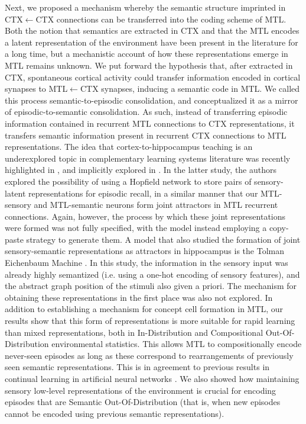 \documentclass{article}
\begin{document}
\newline\newline
Next, we proposed a mechanism whereby the semantic structure imprinted in CTX$\leftarrow$CTX connections can be transferred into the coding scheme of MTL. Both the notion that semantics are extracted in CTX  and that the MTL encodes a latent representation of the environment  have been present in the literature for a long time, but a mechanistic account of how these representations emerge in MTL remains unknown. We put forward the hypothesis that, after extracted in CTX, spontaneous cortical activity could transfer information encoded in cortical synapses to MTL$\leftarrow$CTX synapses, inducing a semantic code in MTL. We called this process semantic-to-episodic consolidation, and conceptualized it as a mirror of episodic-to-semantic consolidation. As such, instead of transferring episodic information contained in recurrent MTL connections to CTX representations, it transfers semantic information present in recurrent CTX connections to MTL representations. The idea that cortex-to-hippocampus teaching is an underexplored topic in complementary learning systems literature was recently highlighted in , and implicitly explored in . In the latter study, the authors explored the possibility of using a Hopfield network to store pairs of sensory-latent representations for episodic recall, in a similar manner that our MTL-sensory and MTL-semantic neurons form joint attractors in MTL recurrent connections. Again, however, the process by which these joint representations were formed was not fully specified, with the model instead employing a copy-paste strategy to generate them. A model that also studied the formation of joint sensory-semantic representations as attractors in hippocampus is the Tolman Eichenbaum Machine . In this study, the information in the sensory input was already highly semantized (i.e. using a one-hot encoding of sensory features), and the abstract graph position of the stimuli also given a priori. The mechanism for obtaining these representations in the first place was also not explored. In addition to establishing a mechanism for concept cell formation in MTL, our results show that this form of representations is more suitable for rapid learning than mixed representations, both in In-Distribution and Compositional Out-Of-Distribution environmental statistics. This allows MTL to compositionally encode never-seen episodes as long as these correspond to rearrangements of previously seen semantic representations. This is in agreement to previous results in continual learning in artificial neural networks . We also showed how maintaining sensory low-level representations of the environment is crucial for encoding episodes that are Semantic Out-Of-Distribution (that is, when new episodes cannot be encoded using previous semantic representations). 
\end{document}
